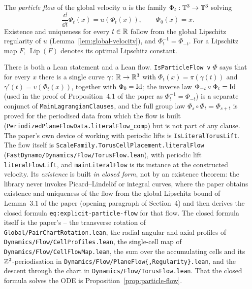 \begin{definition}
  \label{def:dynamics:particle-flow}
  \leanok
  The \emph{particle flow} of the global velocity $u $ is the family
  $\Phi_t:\mathbb{T}^3\to\mathbb{T}^3 $ solving
  \[
    \frac{\dd}{\dd t}\Phi_t(x)=u(\Phi_t(x)),
    \qquad
    \Phi_0(x)=x.
  \]
  Existence and uniqueness for every $t\in\mathbb{R} $ follow from the global Lipschitz regularity
  of $u $ (Lemma~\ref{lem:global-velocity}), and $\Phi_t^{-1}=\Phi_{-t} $.  For a
  Lipschitz map $F $, $\operatorname{Lip}(F) $ denotes its optimal Lipschitz constant.
\end{definition}

There is both a Lean statement and a Lean flow.  \texttt{IsParticleFlow v} $\Phi$ says
that for every $x$ there is a single curve $\gamma\colon\mathbb{R}\to\mathbb{R}^3$ with
$\Phi_t(x)=\pi(\gamma(t))$ and $\gamma'(t)=v(\Phi_t(x))$, together with $\Phi_0=\mathrm{Id}$; the
inverse law $\Phi_{-t}\circ\Phi_t=\mathrm{Id}$ (used in the proof of Proposition~4.1 of the paper
as $\Phi_t^{-1}=\Phi_{-t}$) is a separate conjunct of
\texttt{MainLagrangianClauses}, and the full group law $\Phi_s\circ\Phi_t=\Phi_{s+t}$ is proved
for the periodised data from which the flow is built
(\texttt{PeriodizedPlaneFlowData.literalFlow\_comp}) but is not part of any clause.  The paper's own
device of working with periodic lifts is
\texttt{IsLiteralTorusLift}.  The flow itself is
\texttt{ScaleFamily.TorusCellPlacement.literalFlow}
(\texttt{FastDynamo/Dynamics/Flow/TorusFlow.lean}), with periodic lift
\texttt{literalFlowLift}, and \texttt{mainLiteralFlow} is its instance at the constructed
velocity.  Its \emph{existence} is built \emph{in closed form}, not by an existence theorem:
the library never invokes Picard--Lindel\"of or integral curves, where the paper obtains
existence and uniqueness of the flow from the global Lipschitz bound of
Lemma~3.1 of the paper (opening paragraph of Section~4) and then derives the closed formula
\texttt{eq:explicit-particle-flow} for that flow.  The closed formula itself is the
paper's -- the transverse rotation of
\texttt{Global/PairChartRotation.lean}, the radial angular and axial profiles of
\texttt{Dynamics/Flow/CellProfiles.lean}, the single-cell map of
\texttt{Dynamics/Flow/CellFlowMap.lean}, the sum over the accumulating cells and its
$\mathbb{Z}^2$-periodisation in \texttt{Dynamics/Flow/PlaneFlow\{,Regularity\}.lean}, and the
descent through the chart in \texttt{Dynamics/Flow/TorusFlow.lean}.  That the closed
formula solves the ODE is Proposition~\ref{prop:particle-flow}.

